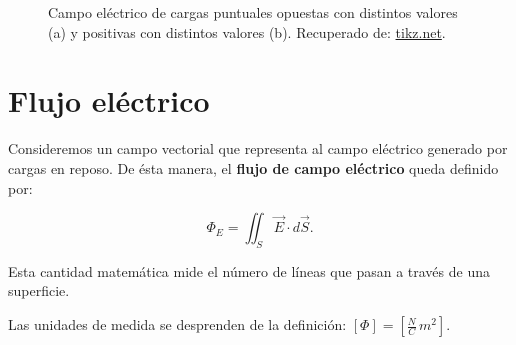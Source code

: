\begin{itemize}
\begin{figure}[H]
        \centering
         \hspace{1cm}
        \caption{Campo eléctrico de cargas puntuales opuestas con distintos valores (a) y positivas con distintos valores (b). Recuperado de: \href{https://tikz.net/electric_fieldlines2/}{tikz.net}. }
        \label{fig:Campo-Cargas-Puntuales-3}
\end{figure}

\end{itemize}

\section{Flujo eléctrico}

Consideremos un campo vectorial que representa  al campo eléctrico generado por cargas en reposo. De ésta manera, el \textbf{flujo de campo eléctrico} queda definido por:
\begin{shaded}
    $$\Phi_E = \iint_S \Vec{E} \cdot d\Vec{S}.$$
\end{shaded}

Esta cantidad matemática mide el número de líneas que pasan a través de una superficie.

Las unidades de medida se desprenden de la definición: $[\Phi] = [\frac{N}{C} \,m^2]$.

